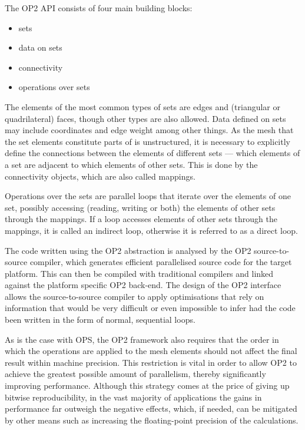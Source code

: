\documentclass[fontsize=11pt, appendixprefix=true]{scrreprt}
\begin{document}
The OP2 API consists of four main building blocks:

\begin{itemize}
  \item sets
  \item data on sets
  \item connectivity
  \item operations over sets
\end{itemize}

The elements of the most common types of sets are edges and (triangular or
quadrilateral) faces, though other types are also allowed. Data defined on sets
may include coordinates and edge weight among other things. As the mesh that the
set elements constitute parts of is unstructured, it is necessary to explicitly
define the connections between the elements of different sets --- which elements
of a set are adjacent to which elements of other sets. This is done by the
connectivity objects, which are also called mappings.

Operations over the sets are parallel loops that iterate over the elements of
one set, possibly accessing (reading, writing or both) the elements of other
sets through the mappings. If a loop accesses elements of other sets through the
mappings, it is called an indirect loop, otherwise it is referred to as a direct
loop.

The code written using the OP2 abstraction is analysed by the OP2
source-to-source compiler, which generates efficient parallelised source code
for the target platform. This can then be compiled with traditional compilers
and linked against the platform specific OP2 back-end. The design of the OP2
interface allows the source-to-source compiler to apply optimisations that rely
on information that would be very difficult or even impossible to infer had the
code been written in the form of normal, sequential loops.

As is the case with OPS, the OP2 framework also requires that the order in which
the operations are applied to the mesh elements should not affect the final
result within machine precision. This restriction is vital in order to allow OP2
to achieve the greatest possible amount of parallelism, thereby significantly
improving performance. Although this strategy comes at the price of giving up
bitwise reproducibility, in the vast majority of applications the gains in
performance far outweigh the negative effects, which, if needed, can be
mitigated by other means such as increasing the floating-point precision of the
calculations.
\end{document}
